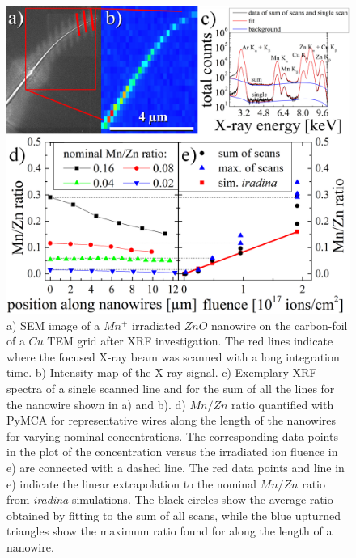 \begin{figure}[ht]
	\centering
		\includegraphics[width=.7\textwidth]{images/largeXRF.png}
	\caption{a) SEM image of a $Mn^+$ irradiated $ZnO$ nanowire on the carbon-foil of a $Cu$ TEM grid after XRF investigation. The red lines indicate where the focused X-ray beam was scanned with a long integration time. b) Intensity map of the X-ray signal. c) Exemplary XRF-spectra of a single scanned line and for the sum of all the lines for the nanowire shown in a) and b). d) $Mn/Zn$ ratio quantified with PyMCA for representative wires along the length of the nanowires for varying nominal concentrations. The corresponding data points in the plot of the concentration versus the irradiated ion fluence in e) are connected with a dashed line. The red data points and line in e) indicate the linear extrapolation to the nominal $Mn/Zn$ ratio from \emph{iradina} simulations. The black circles show the average ratio obtained by fitting to the sum of all scans, while the blue upturned triangles show the maximum ratio found for along the length of a nanowire.} 
	\label{largeXRF}
\end{figure} 


